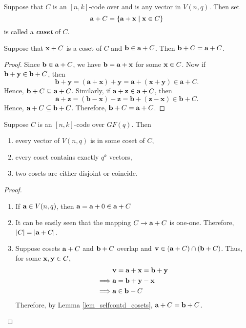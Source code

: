 \documentclass[../main.tex]{subfiles}
\newcommand{\coset}[1]{\code{#1}+C}
\begin{document}
\begin{defn}
	Suppose that $C$ is an $[n,k]$-code over and  is any vector in $V(n,q)$. Then set
	\[
		\textbf{a}+C=\{\textbf{a}+\textbf{x}\;|\; \textbf{x}\in C\}
	\]
	is called a \textbf{\emph{coset}} of $C$.
\end{defn}
\begin{lem}\label{lem_selfcontd_cosets}
	Suppose that $\textbf{x}+C$ is a coset of $C$ and $\textbf{b}\in \textbf{a}+C$. Then $\textbf{b}+C=\textbf{a}+C$.
\end{lem}
\begin{proof}
	Since $\textbf{b}\in \textbf{a}+C$, we have $\textbf{b}=\textbf{a}+\textbf{x}$ for some $\textbf{x}\in C$. Now if $\textbf{b}+\textbf{y}\in \textbf{b}+C$, then
	\[
		\textbf{b}+\textbf{y}=(\textbf{a}+\textbf{x})+\textbf{y}=\textbf{a}+(\textbf{x}+\textbf{y})\in \textbf{a}+C.
	\]
	Hence, $\textbf{b}+C\subseteq \textbf{a}+C$. Similarly, if $\textbf{a}+\textbf{z}\in \textbf{a}+C$, then
	\[
		\textbf{a}+\textbf{z}=(\textbf{b}-\textbf{x})+\textbf{z}=\textbf{b}+(\textbf{z}-\textbf{x})\in \textbf{b}+C.
	\]
	Hence, $\textbf{a}+C\subseteq \textbf{b}+C$. Therefore, $\textbf{b}+C=\textbf{a}+C$.
\end{proof}

\begin{thm}\label{thm_lagrange-subgroups}
	Suppose $C$ is an $[n,k]$-code over $GF(q)$. Then
	\begin{enumerate}[label=(\roman*)]
	\itemsep-1mm
		\item every vector of $V(n,q)$ is in some coset of $C$,
		\item every coset contains exactly $q^k$ vectors,
		\item two cosets are either disjoint or coincide.
	\end{enumerate}
\end{thm}
\begin{proof}
	\hfill
	\begin{enumerate}[label=(\roman*)]
	\itemsep-1mm
		\item If $\textbf{a}\in V(n,q)$, then $\textbf{a}=\textbf{a}+0\in \textbf{a}+C$
		\item It can be easily seen that the mapping $C\rightarrow \textbf{a}+C$ is one-one. Therefore, $|C|=|\textbf{a}+C|$.
		\item Suppose cosets $\coset{a}$ and $\coset{b}$ overlap and $\code{v}\in (\coset{a})\cap (\coset{b})$. Thus, for some $\textbf{x},\textbf{y}\in C$, 
		\begin{align*}
			& \code{v} = \code{a}+\code{x} = \code{b}+\code{y}\\
			\implies & \code{a} = \code{b}+\code{y}-\code{x}\\
			\implies & \code{a}\in \coset{b}\\
		\end{align*}
		Therefore, by Lemma \ref{lem_selfcontd_cosets}, $\coset{a}=\coset{b}$.   
	\end{enumerate}
\end{proof}
\end{document}
